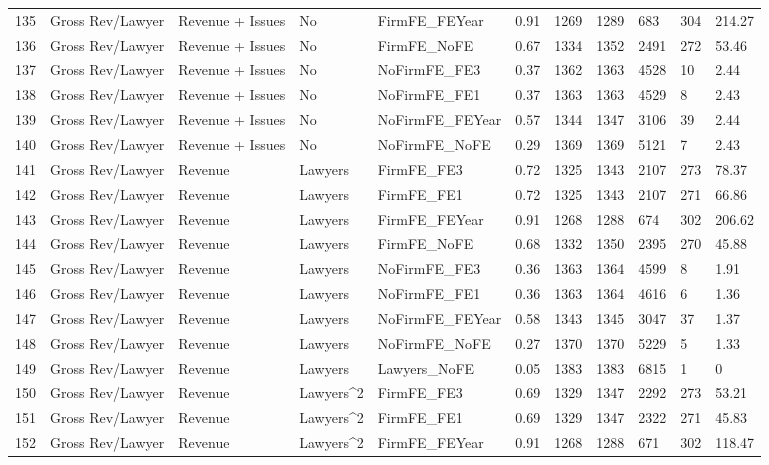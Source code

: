 \begin{table}[ht]
\begin{tabular}{rllllllllll}
  135 & Gross Rev/Lawyer & Revenue + Issues & No & FirmFE\_FEYear & 0.91 & 1269 & 1289 & 683 & 304 & 214.27 \\ 
  136 & Gross Rev/Lawyer & Revenue + Issues & No & FirmFE\_NoFE & 0.67 & 1334 & 1352 & 2491 & 272 & 53.46 \\ 
  137 & Gross Rev/Lawyer & Revenue + Issues & No & NoFirmFE\_FE3 & 0.37 & 1362 & 1363 & 4528 & 10 & 2.44 \\ 
  138 & Gross Rev/Lawyer & Revenue + Issues & No & NoFirmFE\_FE1 & 0.37 & 1363 & 1363 & 4529 & 8 & 2.43 \\ 
  139 & Gross Rev/Lawyer & Revenue + Issues & No & NoFirmFE\_FEYear & 0.57 & 1344 & 1347 & 3106 & 39 & 2.44 \\ 
  140 & Gross Rev/Lawyer & Revenue + Issues & No & NoFirmFE\_NoFE & 0.29 & 1369 & 1369 & 5121 & 7 & 2.43 \\ 
  141 & Gross Rev/Lawyer & Revenue & Lawyers & FirmFE\_FE3 & 0.72 & 1325 & 1343 & 2107 & 273 & 78.37 \\ 
  142 & Gross Rev/Lawyer & Revenue & Lawyers & FirmFE\_FE1 & 0.72 & 1325 & 1343 & 2107 & 271 & 66.86 \\ 
  143 & Gross Rev/Lawyer & Revenue & Lawyers & FirmFE\_FEYear & 0.91 & 1268 & 1288 & 674 & 302 & 206.62 \\ 
  144 & Gross Rev/Lawyer & Revenue & Lawyers & FirmFE\_NoFE & 0.68 & 1332 & 1350 & 2395 & 270 & 45.88 \\ 
  145 & Gross Rev/Lawyer & Revenue & Lawyers & NoFirmFE\_FE3 & 0.36 & 1363 & 1364 & 4599 & 8 & 1.91 \\ 
  146 & Gross Rev/Lawyer & Revenue & Lawyers & NoFirmFE\_FE1 & 0.36 & 1363 & 1364 & 4616 & 6 & 1.36 \\ 
  147 & Gross Rev/Lawyer & Revenue & Lawyers & NoFirmFE\_FEYear & 0.58 & 1343 & 1345 & 3047 & 37 & 1.37 \\ 
  148 & Gross Rev/Lawyer & Revenue & Lawyers & NoFirmFE\_NoFE & 0.27 & 1370 & 1370 & 5229 & 5 & 1.33 \\ 
  149 & Gross Rev/Lawyer & Revenue & Lawyers & Lawyers\_NoFE & 0.05 & 1383 & 1383 & 6815 & 1 & 0 \\ 
  150 & Gross Rev/Lawyer & Revenue & Lawyers^2 & FirmFE\_FE3 & 0.69 & 1329 & 1347 & 2292 & 273 & 53.21 \\ 
  151 & Gross Rev/Lawyer & Revenue & Lawyers^2 & FirmFE\_FE1 & 0.69 & 1329 & 1347 & 2322 & 271 & 45.83 \\ 
  152 & Gross Rev/Lawyer & Revenue & Lawyers^2 & FirmFE\_FEYear & 0.91 & 1268 & 1288 & 671 & 302 & 118.47 \\ 

\end{tabular}
\end{table}
